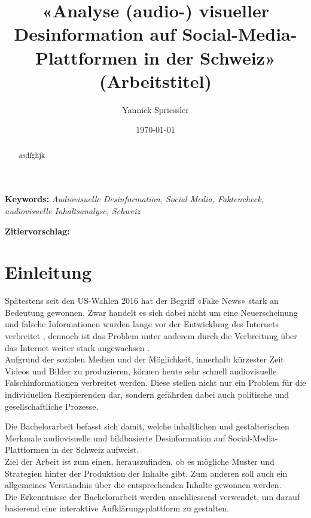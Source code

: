 \documentclass[12pt,a4paper]{article}        %
\title{«Analyse (audio-) visueller Desinformation auf Social-Media-Plattformen in der Schweiz» (Arbeitstitel)}        %
\author{Yannick Spriessler}     %
\date{\today}     %
\begin{document}
\begin{titlingpage} %
  
  \nocite{howard_trees_2017}  %
\end{titlingpage}
\pagebreak      %
\renewcommand{\abstractname}{Abstract}
\begin{abstract}
  \setlength{\parindent}{0pt}
  asdfghjk
\end{abstract}

\textbf{Keywords:} \textit{Audiovisuelle Desinformation, Social Media, Faktencheck, audiovisuelle Inhaltsanalyse, Schweiz}

\textbf{Zitiervorschlag:}
\linebreak
\pagebreak
\thispagestyle{empty}
\setcounter{page}{0}    %
\tableofcontents        %
\pagebreak

\section{Einleitung}
Spätestens seit den US-Wahlen 2016 hat der Begriff «Fake News» stark an Bedeutung gewonnen. Zwar handelt es sich dabei nicht um eine Neuerscheinung und falsche Informationen wurden lange vor der Entwicklung des Internets verbreitet \parencites[214]{allcott_social_2017}[247]{hohlfeld_schlechte_2020}[1]{khan_fake_2021}, dennoch ist das Problem unter anderem durch die Verbreitung über das Internet weiter stark angewachsen \parencites[214–215]{allcott_social_2017}[1]{khan_fake_2021}[1]{lazer_science_2018}[4]{ceron_fake_2021}.\\
Aufgrund der sozialen Medien und der Möglichkeit, innerhalb kürzester Zeit Videos und Bilder zu produzieren, können heute sehr schnell audiovisuelle Falschinformationen verbreitet werden. Diese stellen nicht nur ein Problem für die individuellen Rezipierenden dar, sondern gefährden dabei auch politische und gesellschaftliche Prozesse.

Die Bachelorarbeit befasst sich damit, welche inhaltlichen und gestalterischen Merkmale audiovisuelle und bildbasierte Desinformation auf Social-Media-Plattformen in der Schweiz aufweist. \\
Ziel der Arbeit ist zum einen, herauszufinden, ob es mögliche Muster und
Strategien hinter der Produktion der Inhalte gibt. Zum anderen soll auch ein allgemeines Verständnis über die entsprechenden Inhalte gewonnen werden. \\
Die Erkenntnisse der Bachelorarbeit werden anschliessend verwendet, um darauf basierend eine interaktive Aufklärungsplattform zu gestalten.
\end{document}
